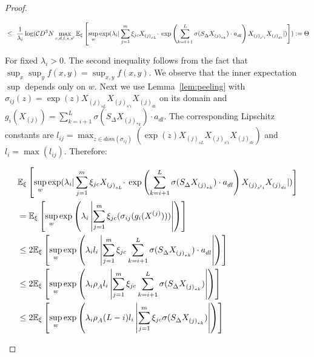\begin{proof}
\begin{small}
\begin{equation}
\begin{aligned}
&\leq~  \frac{1}{\lambda_i} \log ( \mathcal{C} D^3 N  \max_{c, d, l, s, s'} \mathbb{E}_{\xi}\left[\sup_{w} \exp(\lambda_i  | \sum_{j=1}^m \xi_{jc}  X^{}_{{(j)}_{sL}} \cdot \right.  \left. \exp\left( \sum_{k=i+1}^L \sigma(S^{}_{\Delta} X^{}_{{(j)}_{*k}}) \cdot a^{}_{dl}\right) X^{}_{{(j)}_{s'i}} X^{}_{{(j)}_{di}} |)  \right] ) :=\Theta \\
\end{aligned}
\end{equation}
\end{small}
For fixed $\lambda_i > 0$. The second inequality follows from the fact that $\sup_x \sup_y f(x,y) = \sup_{x,y} f(x,y)$.
We observe that the inner expectation $\sup$ depends only on $w$.
Next we use Lemma~\ref{lem:peeling} with $\sigma_{ij}(z) = \exp(z)X^{}_{{(j)}_{sL}} X^{}_{{(j)}_{s'i}} X^{}_{{(j)}_{di}}$ on its domain and $g_i(X_{(j)})=\sum_{k=i+1}^L \sigma(S^{}_{\Delta} X^{}_{{(j)}_{*k}}) \cdot a^{}_{dl}$. The corresponding Lipschitz constants are $l_{ij} = \max_{z \in dom(\sigma_{ij})}(\exp(z)X_{(j)_{sL}}X_{(j)_{s'i}} X_{(j)_{di}})$ and $l_i = \max(l_{ij})$. Therefore:
\begin{small}
\begin{equation}
\begin{aligned}
&\E_{\xi}\left[\sup_{w} \exp(\lambda_i | \sum_{j=1}^m \xi_{jc}  X^{}_{{(j)}_{sL}} \cdot \right. \left. \exp\left( \sum_{k=i+1}^L \sigma(S^{}_{\Delta} X^{}_{{(j)}_{*k}}) \cdot a^{}_{dl}\right) X^{}_{{(j)}_{s'i}} X^{}_{{(j)}_{di}} |)  \right] \\
&=\E_{\xi}\left[ \sup_{w}  \exp \left( \lambda_i  \left| \sum_{j=1}^m \xi_{jc} (\sigma_{ij}(g_i(X^{(j)}))) \right| \right)\right] \\
&\leq 2\E_{\xi}\left[ \sup_{w}  \exp \left( \lambda_i l_i \left| \sum_{j=1}^m \xi_{jc}    \sum_{k=i+1}^L \sigma(S^{}_{\Delta} X^{}_{{(j)}_{*k}}) \cdot a^{}_{dl} \right| \right)\right] \\
&\leq 2\E_{\xi}\left[ \sup_{w}  \exp \left( \lambda_i \rho^{}_A  l_i  \left| \sum_{j=1}^m \xi_{jc}    \sum_{k=i+1}^L \sigma(S^{}_{\Delta} X^{}_{{(j)}_{*k}}) \right| \right)\right] \\
&\leq 2\E_{\xi}\left[ \sup_{w}  \exp \left(\lambda_i \rho^{}_A  (L-i) l_i \left| \sum_{j=1}^m \xi_{jc}   \sigma(S^{}_{\Delta} X^{}_{{(j)}_{*k}}) \right| \right)\right] \\

\end{aligned}
\end{equation}
\end{small}
\end{proof}
